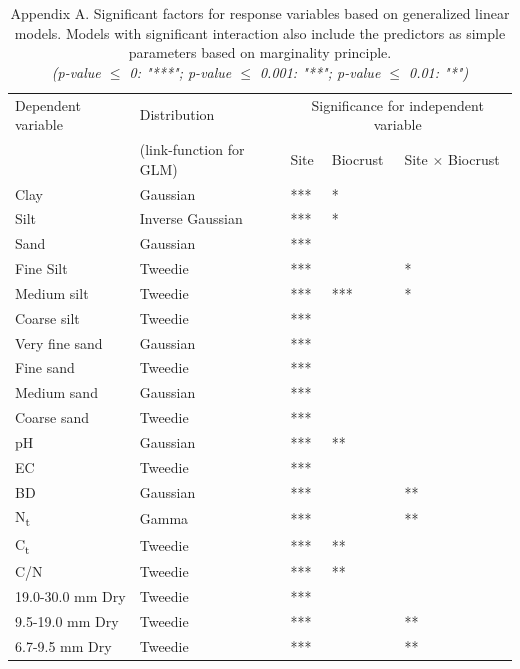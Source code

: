 {\begin{table}[htbp] %
\centering %
\caption{Appendix A. Significant factors for response variables based on generalized linear models. Models with significant interaction also include the predictors as simple parameters based on marginality principle. \\ %
\textit{(p-value $\le$ 0: "***"; p-value $\le$ 0.001: "**"; p-value $\le$ 0.01: "*")}} %
\label{tab:appendix_a} %
\begin{tabular}{@{}lllll@{}} %
\toprule
Dependent variable & Distribution & \multicolumn{3}{c}{Significance for independent variable} \\
\cmidrule(lr){3-5} %
 & (link-function for GLM) & Site & Biocrust & Site $\times$ Biocrust \\ %
\midrule
Clay	& Gaussian	& ***	& *	& \\
Silt	& Inverse Gaussian	& ***	& *	& \\
Sand	& Gaussian	& ***	& 	& \\
Fine Silt	& Tweedie	& ***	& 	& * \\
Medium silt	& Tweedie	& ***	& ***	& * \\
Coarse silt	& Tweedie	& ***	& 	&  \\
Very fine sand	& Gaussian	& ***	& 	&  \\
Fine sand	& Tweedie	& ***	& 	&  \\
Medium sand	& Gaussian	& ***	& 	&  \\
Coarse sand	& Tweedie	& ***	& 	&  \\
pH	& Gaussian	& ***	& **	&  \\
EC	& Tweedie	& ***	& 	&  \\
BD	& Gaussian	& ***	& 	& ** \\
N\textsubscript{t}	& Gamma	& ***	& 	& ** \\ %
C\textsubscript{t}	& Tweedie	& ***	& **	&  \\ %
C/N	& Tweedie	& ***	& **	&  \\
19.0-30.0 mm Dry	& Tweedie	& ***	& 	&  \\
9.5-19.0 mm Dry	& Tweedie	& ***	& 	& ** \\
6.7-9.5 mm Dry	& Tweedie	& ***	& 	& ** \\

\end{tabular}
\end{table}}
